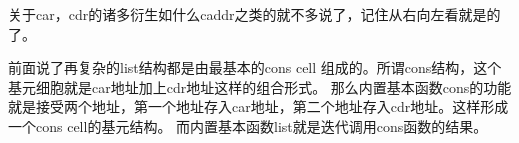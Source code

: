 \documentclass[11pt,oneside]{book}
\begin{document}
\begin{common-format}
关于car，cdr的诸多衍生如什么caddr之类的就不多说了，记住从右向左看就是的了。

前面说了再复杂的list结构都是由最基本的cons cell 组成的。所谓cons结构，这个基元细胞就是car地址加上cdr地址这样的组合形式。
那么内置基本函数cons的功能就是接受两个地址，第一个地址存入car地址，第二个地址存入cdr地址。这样形成一个cons cell的基元结构。
而内置基本函数list就是迭代调用cons函数的结果。

% 
% 
% 
% 
% 
% 
% 
% 
% 
% 


\end{common-format}
\end{document}
